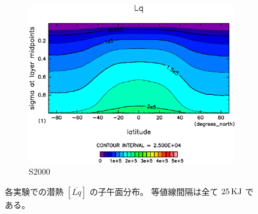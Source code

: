 \documentclass[body]{subfiles}
\begin{document}
\begin{figure}[t]
\begin{subfigure}{.4\textwidth}
		\includegraphics[width=\columnwidth]{S2000/Lq,time=7300:7665-crop-rotate.pdf}
		\caption{S2000}\label{LqS2000}
	\end{subfigure}
	\caption[各実験での潜熱の子午面分布]{
		各実験での潜熱 \([\overline{Lq}]\) の子午面分布。
		等値線間隔は全て \(25\hmu{KJ}\) である。
	}\label{Lq}
\end{figure}
\end{document}
